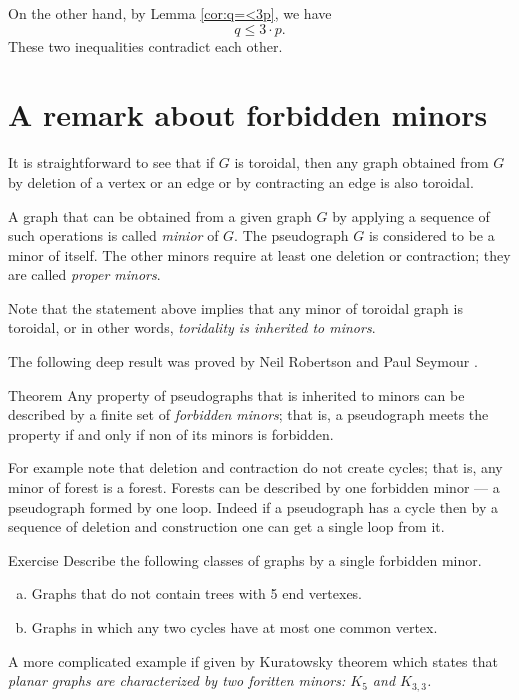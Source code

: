 On the other hand, by Lemma \ref{cor:q=<3p}, we have
\[q\le 3\cdot p.\]
These two inequalities contradict each other.
 \qeds

\section*{A remark about forbidden minors}

It is straightforward to see that if $G$ is toroidal, then any graph obtained from $G$ by deletion of a vertex or an edge or by contracting an edge is also toroidal.

A graph that can be obtained from a given graph $G$ by applying a sequence of such operations is called \emph{minior} of $G$.
The pseudograph $G$ is considered to be a minor of itself.
The other minors require at least one deletion or contraction; they are called \emph{proper minors}.

Note that the statement above implies that any minor of toroidal graph is toroidal, or in other words, {}\emph{toridality is inherited to minors}.

The following deep result was proved by Neil Robertson and Paul Seymour \cite{robertson-seymour}.

\begin{thm}{Theorem}
Any property of pseudographs that is inherited to minors can be 
described by a finite set of \emph{forbidden minors};
that is,  a pseudograph meets the property if and only if non of its minors is forbidden.
\end{thm}

For example note that deletion and contraction do not create cycles;
that is, any minor of forest is a forest.
Forests can be described by one forbidden minor --- a pseudograph formed by one loop.
Indeed if a pseudograph has a cycle then by a sequence of deletion and construction one can get a single loop from it.

\begin{thm}{Exercise}
Describe the following classes of graphs by a single forbidden minor.
\begin{enumerate}[(a)]
 \item Graphs that do not contain trees with 5 end vertexes.
 \item Graphs in which any two cycles have at most one common vertex.
\end{enumerate}
\end{thm}

A more complicated example if given by Kuratowsky theorem which states that \emph{planar graphs are characterized by two foritten minors: $K_5$ and $K_{3,3}$.}

